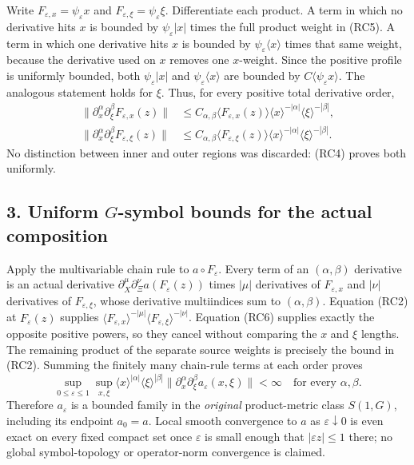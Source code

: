 \documentclass[
  11pt,
]{article}
\begin{document}
Write \(F_{\varepsilon,x}=\psi_\varepsilon x\) and
\(F_{\varepsilon,\xi}=\psi_\varepsilon\xi\). Differentiate each product.
A term in which no derivative hits \(x\) is bounded by
\(\psi_\varepsilon|x|\) times the full product weight in (RC5). A term
in which one derivative hits \(x\) is bounded by
\(\psi_\varepsilon\langle x\rangle\) times that same weight, because the
derivative used on \(x\) removes one \(x\)-weight. Since the positive
profile is uniformly bounded, both \(\psi_\varepsilon|x|\) and
\(\psi_\varepsilon\langle x\rangle\) are bounded by
\(C\langle\psi_\varepsilon x\rangle\). The analogous statement holds for
\(\xi\). Thus, for every positive total derivative order, \[
 \begin{aligned}
 \|\partial_x^\alpha\partial_\xi^\beta
       F_{\varepsilon,x}(z)\|
 &\le C_{\alpha,\beta}
       \langle F_{\varepsilon,x}(z)\rangle
       \langle x\rangle^{-|\alpha|}
       \langle\xi\rangle^{-|\beta|},\\
 \|\partial_x^\alpha\partial_\xi^\beta
       F_{\varepsilon,\xi}(z)\|
 &\le C_{\alpha,\beta}
       \langle F_{\varepsilon,\xi}(z)\rangle
       \langle x\rangle^{-|\alpha|}
       \langle\xi\rangle^{-|\beta|}.
 \end{aligned}
 \tag{RC6}
\] No distinction between inner and outer regions was discarded: (RC4)
proves both uniformly.

\subsection{\texorpdfstring{3. Uniform \(G\)-symbol bounds for the
actual
composition}{3. Uniform G-symbol bounds for the actual composition}}\label{uniform-g-symbol-bounds-for-the-actual-composition}

Apply the multivariable chain rule to \(a\circ F_\varepsilon\). Every
term of an \((\alpha,\beta)\) derivative is an actual derivative
\(\partial_X^\mu\partial_\Xi^\nu a(F_\varepsilon(z))\) times \(|\mu|\)
derivatives of \(F_{\varepsilon,x}\) and \(|\nu|\) derivatives of
\(F_{\varepsilon,\xi}\), whose derivative multiindices sum to
\((\alpha,\beta)\). Equation (RC2) at \(F_\varepsilon(z)\) supplies
\(\langle F_{\varepsilon,x}\rangle^{-|\mu|}
\langle F_{\varepsilon,\xi}\rangle^{-|\nu|}\). Equation (RC6) supplies
exactly the opposite positive powers, so they cancel without comparing
the \(x\) and \(\xi\) lengths. The remaining product of the separate
source weights is precisely the bound in (RC2). Summing the finitely
many chain-rule terms at each order proves \[
 \sup_{0\le\varepsilon\le1}
 \sup_{x,\xi}
 \langle x\rangle^{|\alpha|}
 \langle\xi\rangle^{|\beta|}
 \|\partial_x^\alpha\partial_\xi^\beta
             a_\varepsilon(x,\xi)\|
       <\infty
       \quad\text{for every }\alpha,\beta .
 \tag{RC7}
\] Therefore \(a_\varepsilon\) is a bounded family in the
\emph{original} product-metric class \(S(1,G)\), including its endpoint
\(a_0=a\). Local smooth convergence to \(a\) as
\(\varepsilon\downarrow0\) is even exact on every fixed compact set once
\(\varepsilon\) is small enough that \(|\varepsilon z|\le1\) there; no
global symbol-topology or operator-norm convergence is claimed.
\end{document}
